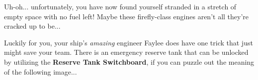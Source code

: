 Uh-oh... unfortunately, you have now found yourself stranded
in a stretch of empty space with no fuel left! Maybe these firefly-class
engines aren't all they're cracked up to be...

Luckily for you,
your ship's \textit{amazing} engineer Faylee does have one trick that
just might save your team. There is
an emergency reserve tank that can be unlocked by utilizing the
\textbf{Reserve Tank Switchboard}, if you can puzzle out the meaning
of the following image...

\begin{center}
\end{center} 

